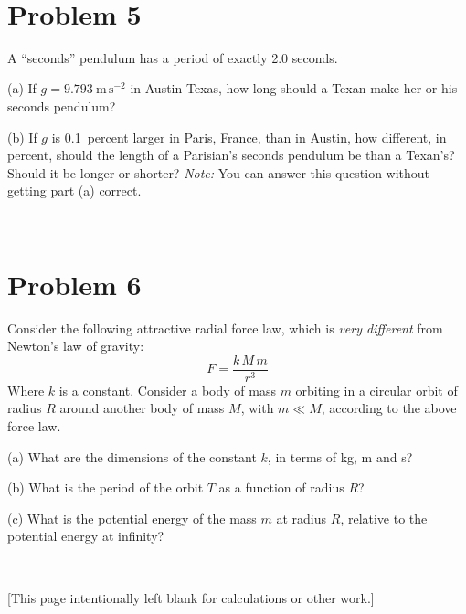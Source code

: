 \documentclass[12pt]{article}
\begin{document}
\vfill ~

\clearpage

\section*{Problem 5}

A ``seconds'' pendulum has a period of exactly 2.0 seconds.

(a) If $g=9.793~\mathrm{m\,s^{-2}}$ in Austin Texas, how long should a
Texan make her or his seconds pendulum?

\vfill

(b) If $g$ is 0.1~percent larger in Paris, France, than in Austin, how
different, in percent, should the length of a Parisian's seconds
pendulum be than a Texan's?  Should it be longer or shorter?
\emph{Note:} You can answer this question without getting part (a)
correct.

\vfill ~

\clearpage

\section*{Problem 6}

Consider the following attractive radial force law, which is
\emph{very different} from Newton's law of gravity:
\begin{equation}
F = \frac{k\,M\,m}{r^3}
\end{equation}
Where $k$ is a constant.  Consider a body of mass $m$ orbiting in a
circular orbit of radius $R$ around another body of mass $M$, with
$m\ll M$, according to the above force law.

(a) What are the dimensions of the constant $k$, in terms of kg, m and
s?

\vfill

(b) What is the period of the orbit $T$ as a function of radius $R$?

\vfill

(c) What is the potential energy of the mass $m$ at radius $R$,
relative to the potential energy at infinity?

\vfill ~

\clearpage

[This page intentionally left blank for calculations or other work.]
\end{document}

